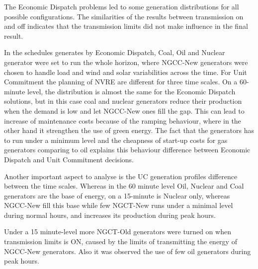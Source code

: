 \documentclass[12pt,LUDisStyle,twosided]{book}
\begin{document}
The Economic Dispatch problems led to some generation distributions for all possible configurations. The similarities of the results between transmission on and off indicates that the transmission limits did not make influence in the final result. 


In the schedules generates by Economic Dispatch, Coal, Oil and Nuclear generator were set to run the whole horizon, where NGCC-New generators were chosen to handle load and wind and solar variabilities across the time. For Unit Commitment the planning of NVRE are different for three time scales. On a 60-minute level, the distribution is almost the same for the Economic Dispatch solutions, but in this case coal and nuclear generators reduce their production when the demand is low and let NGCC-New ones fill the gap. This can lead to increase of maintenance costs because of the ramping behaviour, where in the other hand it strengthen the use of green energy. The fact that the generators has to run under a minimum level and the cheapness of start-up costs for gas generators comparing to oil explains this behaviour difference between Economic Dispatch and Unit Commitment decisions.


Another important aspect to analyse is the UC generation profiles difference between the time scales. Whereas in the 60 minute level Oil, Nuclear and Coal generators are the base of energy, on a 15-minute is  Nuclear only, whereas NGCC-New fill this base while few NGCT-New runs under a minimal level during normal hours, and increases its production during peak hours. 

Under a 15 minute-level more NGCT-Old generators were turned on when transmission limits is ON, caused by the limits of transmitting the energy of NGCC-New generators. Also it was observed the use of few oil generators during peak hours.
\end{document}
